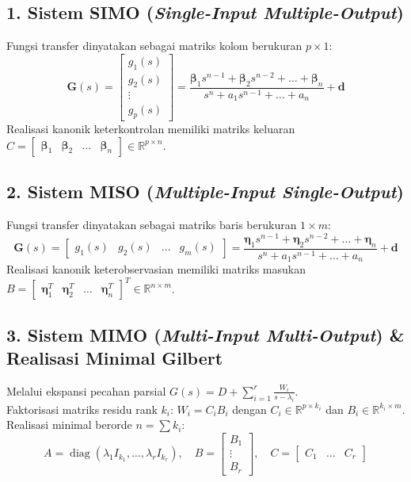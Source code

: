 \documentclass[11pt,a4paper]{article}
\begin{document}
\subsection{1. Sistem SIMO (\textit{Single-Input Multiple-Output})}
Fungsi transfer dinyatakan sebagai matriks kolom berukuran $p \times 1$:
\begin{equation*}
    \mathbf{G}(s) = \begin{bmatrix} g_1(s) \\ g_2(s) \\ \vdots \\ g_p(s) \end{bmatrix} = \frac{\boldsymbol{\beta}_1 s^{n-1} + \boldsymbol{\beta}_2 s^{n-2} + \dots + \boldsymbol{\beta}_n}{s^n + a_1 s^{n-1} + \dots + a_n} + \mathbf{d}
\end{equation*}
Realisasi kanonik keterkontrolan memiliki matriks keluaran $C = \begin{bmatrix} \boldsymbol{\beta}_1 & \boldsymbol{\beta}_2 & \dots & \boldsymbol{\beta}_n \end{bmatrix} \in \mathbb{R}^{p \times n}$.

\subsection{2. Sistem MISO (\textit{Multiple-Input Single-Output})}
Fungsi transfer dinyatakan sebagai matriks baris berukuran $1 \times m$:
\begin{equation*}
    \mathbf{G}(s) = \begin{bmatrix} g_1(s) & g_2(s) & \dots & g_m(s) \end{bmatrix} = \frac{\boldsymbol{\eta}_1 s^{n-1} + \boldsymbol{\eta}_2 s^{n-2} + \dots + \boldsymbol{\eta}_n}{s^n + a_1 s^{n-1} + \dots + a_n} + \mathbf{d}
\end{equation*}
Realisasi kanonik keterobservasian memiliki matriks masukan $B = \begin{bmatrix} \boldsymbol{\eta}_1^T & \boldsymbol{\eta}_2^T & \dots & \boldsymbol{\eta}_n^T \end{bmatrix}^T \in \mathbb{R}^{n \times m}$.

\subsection{3. Sistem MIMO (\textit{Multi-Input Multi-Output}) \& Realisasi Minimal Gilbert}
Melalui ekspansi pecahan parsial $G(s) = D + \sum_{i=1}^r \frac{W_i}{s - \lambda_i}$.\\
Faktorisasi matriks residu rank $k_i$: $W_i = C_i B_i$ dengan $C_i \in \mathbb{R}^{p \times k_i}$ dan $B_i \in \mathbb{R}^{k_i \times m}$. Realisasi minimal berorde $n = \sum k_i$:
\begin{equation*}
    A = \operatorname{diag}(\lambda_1 I_{k_1}, \dots, \lambda_r I_{k_r}), \quad B = \begin{bmatrix} B_1 \\ \vdots \\ B_r \end{bmatrix}, \quad C = \begin{bmatrix} C_1 & \dots & C_r \end{bmatrix}
\end{equation*}
\end{document}
